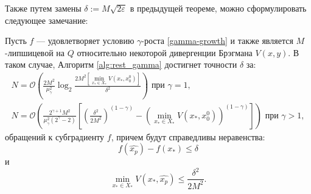 Также путем замены $\delta := M \sqrt{2 \varepsilon}$ в предыдущей теореме, можно сформулировать следующее замечание:
\begin{remark}
    Пусть $f$ --- удовлетворяет условию $\gamma$-роста \eqref{gamma-growth} и также является $M$-липшицевой на $Q$ относительно некоторой дивергенции Брэгмана $V(x, y)$. В таком случае, Алгоритм \ref{alg:rest_gamma} достигнет точности $\delta$ за:
    \begin{equation}
        \begin{aligned}
           N = \mathcal{O}\left(\frac{2 M^2}{\mu_{\gamma}^2} \log_2{\frac{2 M^2 \left[\min\limits_{x_* \in X_*}{V(x_*, x_0^0)}\right]}{\delta^2}}\right) \text{ при } \gamma = 1, \\
           N = \mathcal{O}\left(\frac{2^{\gamma + 1} M^2}{\mu_{\gamma}^2 (2^{\gamma} - 2)} \left[\left(\frac{\delta^2}{2 M^2}\right)^{(1 - \gamma)} - \left(\min\limits_{x_* \in X_*}{V(x_*, x_0^0)}\right)^{(1 - \gamma)}\right]\right) \text{ при } \gamma > 1,
        \end{aligned}
    \end{equation}
    обращений к субградиенту $f$, причем будут справедливы неравенства:
    \begin{equation}
       f(\widehat{x_p}) - f(x_*)  \leq \delta 
    \end{equation}
    и
    \begin{equation}
       \min\limits_{x_* \in X_*}{V(x_*, \widehat{x_p})} \leq \frac{\delta^2}{2 M^2}.
    \end{equation}
\end{remark}

